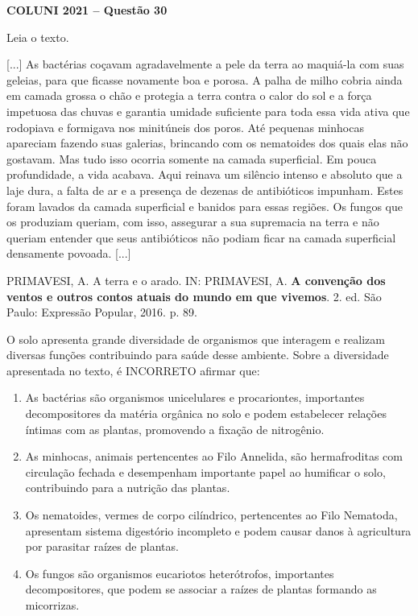 \textbf{COLUNI 2021 -- Questão 30}\par\medskip Leia o texto.

\par

[...] As bactérias coçavam agradavelmente a pele da terra ao maquiá-la com suas geleias, para que ficasse novamente boa e porosa. A palha de milho cobria ainda em camada grossa o chão e protegia a terra contra o calor do sol e a força impetuosa das chuvas e garantia umidade suficiente para toda essa vida ativa que rodopiava e formigava nos minitúneis dos poros. Até pequenas minhocas apareciam fazendo suas galerias, brincando com os nematoides dos quais elas não gostavam. Mas tudo isso ocorria somente na camada superficial. Em pouca profundidade, a vida acabava. Aqui reinava um silêncio intenso e absoluto que a laje dura, a falta de ar e a presença de dezenas de antibióticos impunham. Estes foram lavados da camada superficial e banidos para essas regiões. Os fungos que os produziam queriam, com isso, assegurar a sua supremacia na terra e não queriam entender que seus antibióticos não podiam ficar na camada superficial densamente povoada. [...]

\par

PRIMAVESI, A. A terra e o arado. IN: PRIMAVESI, A. \textbf{A convenção dos ventos e outros contos atuais do mundo em que vivemos}. 2. ed. São Paulo: Expressão Popular, 2016. p. 89.

\par

O solo apresenta grande diversidade de organismos que interagem e realizam diversas funções contribuindo para saúde desse ambiente. Sobre a diversidade apresentada no texto, é INCORRETO afirmar que:\begin{enumerate}
\item As bactérias são organismos unicelulares e procariontes, importantes decompositores da matéria orgânica
       no solo e podem estabelecer relações íntimas com as plantas, promovendo a fixação de nitrogênio.
\item As minhocas, animais pertencentes ao Filo Annelida, são hermafroditas com circulação fechada e
       desempenham importante papel ao humificar o solo, contribuindo para a nutrição das plantas.
\item Os nematoides, vermes de corpo cilíndrico, pertencentes ao Filo Nematoda, apresentam sistema digestório
       incompleto e podem causar danos à agricultura por parasitar raízes de plantas.
\item Os fungos são organismos eucariotos heterótrofos, importantes decompositores, que podem se associar a
       raízes de plantas formando as micorrizas.

\end{enumerate}

